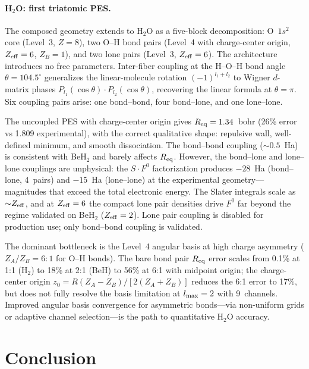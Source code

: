 \documentclass[aps,pra,twocolumn,superscriptaddress,longbibliography,floatfix]{revtex4-2}
\begin{document}
\paragraph{H$_2$O: first triatomic PES.}
The composed geometry extends to H$_2$O as a five-block decomposition:
O~$1s^2$ core (Level~3, $Z=8$), two O--H bond pairs (Level~4 with
charge-center origin, $Z_{\rm eff}=6$, $Z_B=1$), and two lone pairs
(Level~3, $Z_{\rm eff}=6$).  The architecture introduces no free
parameters.  Inter-fiber coupling at the H--O--H bond angle
$\theta = 104.5^\circ$ generalizes the linear-molecule rotation
$(-1)^{l_1 + l_2}$ to Wigner $d$-matrix phases
$P_{l_1}(\cos\theta) \cdot P_{l_2}(\cos\theta)$, recovering the
linear formula at $\theta = \pi$.  Six coupling pairs arise:
one bond--bond, four bond--lone, and one lone--lone.

The uncoupled PES with charge-center origin gives $R_{\rm eq} = 1.34$~bohr
(26\% error vs 1.809 experimental), with the correct qualitative shape:
repulsive wall, well-defined minimum, and smooth dissociation.  The
bond--bond coupling (${\sim}0.5$~Ha) is consistent with BeH$_2$ and
barely affects $R_{\rm eq}$.  However, the bond--lone and lone--lone
couplings are unphysical: the $S \cdot F^0$ factorization produces
$-28$~Ha (bond--lone, 4~pairs) and $-15$~Ha (lone--lone) at the
experimental geometry---magnitudes that exceed the total electronic
energy.  The Slater integrals scale as ${\sim}Z_{\rm eff}$, and at
$Z_{\rm eff} = 6$ the compact lone pair densities drive $F^0$ far
beyond the regime validated on BeH$_2$ ($Z_{\rm eff} = 2$).  Lone pair
coupling is disabled for production use; only bond--bond coupling is
validated.

The dominant bottleneck is the Level~4 angular basis at high charge
asymmetry ($Z_A/Z_B = 6{:}1$ for O--H bonds).  The bare bond pair
$R_{\rm eq}$ error scales from 0.1\% at 1:1 (H$_2$) to 18\% at 2:1
(BeH) to 56\% at 6:1 with midpoint origin; the charge-center origin
$z_0 = R(Z_A - Z_B)/[2(Z_A + Z_B)]$ reduces the 6:1 error to 17\%,
but does not fully resolve the basis limitation at $l_{\rm max} = 2$
with 9~channels.  Improved angular basis convergence for asymmetric
bonds---via non-uniform grids or adaptive channel selection---is
the path to quantitative H$_2$O accuracy.


\section{Conclusion}
\label{sec:conclusion}
\end{document}
